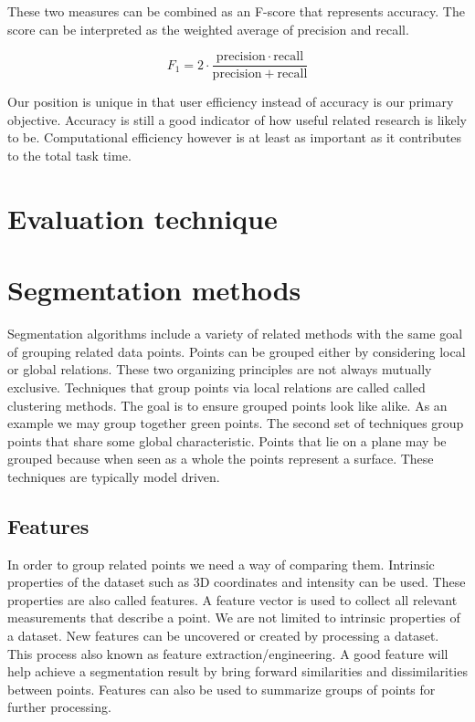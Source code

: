 These two measures can be combined as an F-score that represents accuracy. The score can be interpreted as the weighted average of precision and recall.

\begin{equation} \label{eq:f1score}
	F_1 = 2 \cdot \frac{\mathrm{precision} \cdot \mathrm{recall}}{\mathrm{precision} + \mathrm{recall}}
\end{equation}

Our position is unique in that user efficiency instead of accuracy is our primary objective. Accuracy is still a good indicator of how useful related research is likely to be. Computational efficiency however is at least as important as it contributes to the total task time.

\section{Evaluation technique}



\section{Segmentation methods}

Segmentation algorithms include a variety of related methods with the same goal of grouping related data points. Points can be grouped either by considering local or global relations. These two organizing principles are not always mutually exclusive. Techniques that group points via local relations are called called clustering methods. The goal is to ensure grouped points look like alike. As an example we may group together green points. The second set of techniques group points that share some global characteristic. Points that lie on a plane may be grouped because when seen as a whole the points represent a surface. These techniques are typically model driven.

\subsection{Features}

In order to group related points we need a way of comparing them. Intrinsic properties of the dataset such as 3D coordinates and intensity can be used. These properties are also called features. A feature vector is used to collect all relevant measurements that describe a point. We are not limited to intrinsic properties of a dataset. New features can be uncovered or created by processing a dataset. This process also known as feature extraction/engineering. A good feature will help achieve a segmentation result by bring forward similarities and dissimilarities between points. Features can also be used to summarize groups of points for further processing.


